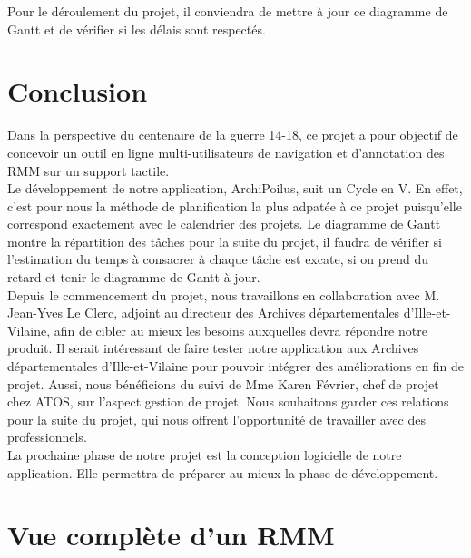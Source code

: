 \documentclass[a4paper]{article}
\begin{document}
	Pour le déroulement du projet, il conviendra de mettre à jour ce diagramme de Gantt et de vérifier si les délais sont respectés.

\newpage
{}
{}
\section*{Conclusion}

	Dans la perspective du centenaire de la guerre 14-18, ce projet a pour objectif de concevoir un outil en ligne multi-utilisateurs de navigation et d’annotation des RMM sur un support tactile.\\
	
	Le développement de notre application, ArchiPoilus, suit un Cycle en V. En effet, c'est pour nous la méthode de planification la plus adpatée à ce projet puisqu'elle correspond exactement avec le calendrier des projets. Le diagramme de Gantt montre la répartition des tâches pour la suite du projet, il faudra de vérifier si l'estimation du temps à consacrer à chaque tâche est excate, si on prend du retard et tenir le diagramme de Gantt à jour.\\
	
	Depuis le commencement du projet, nous travaillons en collaboration avec M. Jean-Yves Le Clerc, adjoint au directeur des Archives départementales d’Ille-et-Vilaine, afin de cibler au mieux les besoins auxquelles devra répondre notre produit. Il serait intéressant de faire tester notre application aux Archives départementales d’Ille-et-Vilaine pour pouvoir intégrer des améliorations en fin de projet. Aussi, nous bénéficions du suivi de Mme Karen Février, chef de projet chez ATOS, sur l’aspect gestion de projet. Nous souhaitons garder ces relations pour la suite du projet, qui nous offrent l’opportunité de travailler avec des professionnels.\\
	
	La prochaine phase de notre projet est la conception logicielle de notre application. Elle permettra de préparer au mieux la phase de développement.

\appendix

\section{Vue compl\`ete d'un RMM}
\label{sec:annexe 1}
\end{document}
